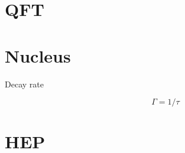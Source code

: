 \section{QFT}

\section{Nucleus}

\begin{description}
    \item [Decay rate] 
	\begin{equation}
	    \label{eqn:nu::decayRate}
	    \Gamma = 1/\tau
	\end{equation}
\end{description}

\section{HEP}
